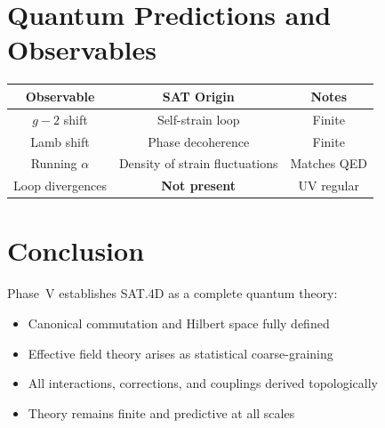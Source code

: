 \documentclass[11pt]{article}
\begin{document}
\section{Quantum Predictions and Observables}

\begin{center}
\begin{tabular}{|c|c|c|}
\hline
Observable & SAT Origin & Notes \\\hline
$g-2$ shift & Self-strain loop & Finite \\
Lamb shift & Phase decoherence & Finite \\
Running $\alpha$ & Density of strain fluctuations & Matches QED \\
Loop divergences & \textbf{Not present} & UV regular \\\hline
\end{tabular}
\end{center}

\section{Conclusion}

Phase~V establishes SAT.4D as a complete quantum theory:
\begin{itemize}
  \item Canonical commutation and Hilbert space fully defined
  \item Effective field theory arises as statistical coarse-graining
  \item All interactions, corrections, and couplings derived topologically
  \item Theory remains finite and predictive at all scales
\end{itemize}
\end{document}

